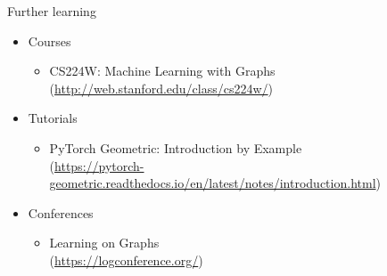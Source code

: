 \documentclass[aspectratio=169]{beamer}
\begin{document}
    \begin{frame}{Further learning}
        \begin{itemize}
            \item Courses
            \begin{itemize}
                \item CS224W: Machine Learning with Graphs \\ (\url{http://web.stanford.edu/class/cs224w/})
            \end{itemize}
            \item Tutorials
            \begin{itemize}
                \item PyTorch Geometric: Introduction by Example \\ (\url{https://pytorch-geometric.readthedocs.io/en/latest/notes/introduction.html})
            \end{itemize}
            \item Conferences
            \begin{itemize}
                \item Learning on Graphs \\ (\url{https://logconference.org/})
            \end{itemize}
        \end{itemize}
    \end{frame}
\end{document}
